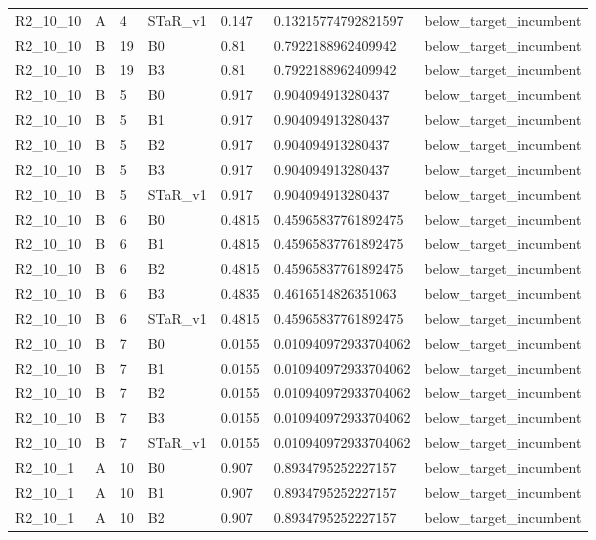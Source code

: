 \begin{tabular}{lllllll}
 R2\_10\_10 & A & 4 & STaR\_v1 & 0.147 & 0.13215774792821597 & below\_target\_incumbent \\
 R2\_10\_10 & B & 19 & B0 & 0.81 & 0.7922188962409942 & below\_target\_incumbent \\
 R2\_10\_10 & B & 19 & B3 & 0.81 & 0.7922188962409942 & below\_target\_incumbent \\
 R2\_10\_10 & B & 5 & B0 & 0.917 & 0.904094913280437 & below\_target\_incumbent \\
 R2\_10\_10 & B & 5 & B1 & 0.917 & 0.904094913280437 & below\_target\_incumbent \\
 R2\_10\_10 & B & 5 & B2 & 0.917 & 0.904094913280437 & below\_target\_incumbent \\
 R2\_10\_10 & B & 5 & B3 & 0.917 & 0.904094913280437 & below\_target\_incumbent \\
 R2\_10\_10 & B & 5 & STaR\_v1 & 0.917 & 0.904094913280437 & below\_target\_incumbent \\
 R2\_10\_10 & B & 6 & B0 & 0.4815 & 0.45965837761892475 & below\_target\_incumbent \\
 R2\_10\_10 & B & 6 & B1 & 0.4815 & 0.45965837761892475 & below\_target\_incumbent \\
 R2\_10\_10 & B & 6 & B2 & 0.4815 & 0.45965837761892475 & below\_target\_incumbent \\
 R2\_10\_10 & B & 6 & B3 & 0.4835 & 0.4616514826351063 & below\_target\_incumbent \\
 R2\_10\_10 & B & 6 & STaR\_v1 & 0.4815 & 0.45965837761892475 & below\_target\_incumbent \\
 R2\_10\_10 & B & 7 & B0 & 0.0155 & 0.010940972933704062 & below\_target\_incumbent \\
 R2\_10\_10 & B & 7 & B1 & 0.0155 & 0.010940972933704062 & below\_target\_incumbent \\
 R2\_10\_10 & B & 7 & B2 & 0.0155 & 0.010940972933704062 & below\_target\_incumbent \\
 R2\_10\_10 & B & 7 & B3 & 0.0155 & 0.010940972933704062 & below\_target\_incumbent \\
 R2\_10\_10 & B & 7 & STaR\_v1 & 0.0155 & 0.010940972933704062 & below\_target\_incumbent \\
 R2\_10\_1 & A & 10 & B0 & 0.907 & 0.8934795252227157 & below\_target\_incumbent \\
 R2\_10\_1 & A & 10 & B1 & 0.907 & 0.8934795252227157 & below\_target\_incumbent \\
 R2\_10\_1 & A & 10 & B2 & 0.907 & 0.8934795252227157 & below\_target\_incumbent \\

\end{tabular}
